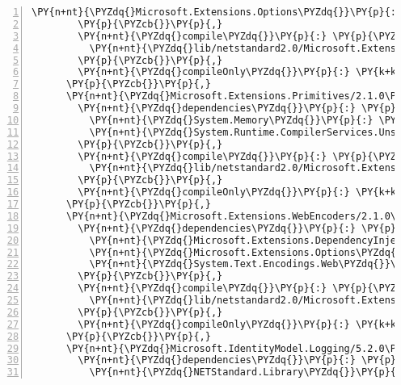 \begin{Verbatim}[commandchars=\\\{\},numbers=left,firstnumber=1,stepnumber=1,numberblanklines=0]
          \PY{n+nt}{\PYZdq{}Microsoft.Extensions.Options\PYZdq{}}\PY{p}{:} \PY{l+s+s2}{\PYZdq{}2.1.0\PYZhy{}rc1\PYZhy{}final\PYZdq{}}
        \PY{p}{\PYZcb{}}\PY{p}{,}
        \PY{n+nt}{\PYZdq{}compile\PYZdq{}}\PY{p}{:} \PY{p}{\PYZob{}}
          \PY{n+nt}{\PYZdq{}lib/netstandard2.0/Microsoft.Extensions.Options.ConfigurationExtensions.dll\PYZdq{}}\PY{p}{:} \PY{p}{\PYZob{}}\PY{p}{\PYZcb{}}
        \PY{p}{\PYZcb{}}\PY{p}{,}
        \PY{n+nt}{\PYZdq{}compileOnly\PYZdq{}}\PY{p}{:} \PY{k+kc}{true}
      \PY{p}{\PYZcb{}}\PY{p}{,}
      \PY{n+nt}{\PYZdq{}Microsoft.Extensions.Primitives/2.1.0\PYZhy{}rc1\PYZhy{}final\PYZdq{}}\PY{p}{:} \PY{p}{\PYZob{}}
        \PY{n+nt}{\PYZdq{}dependencies\PYZdq{}}\PY{p}{:} \PY{p}{\PYZob{}}
          \PY{n+nt}{\PYZdq{}System.Memory\PYZdq{}}\PY{p}{:} \PY{l+s+s2}{\PYZdq{}4.5.0\PYZhy{}rc1\PYZdq{}}\PY{p}{,}
          \PY{n+nt}{\PYZdq{}System.Runtime.CompilerServices.Unsafe\PYZdq{}}\PY{p}{:} \PY{l+s+s2}{\PYZdq{}4.5.0\PYZhy{}rc1\PYZdq{}}
        \PY{p}{\PYZcb{}}\PY{p}{,}
        \PY{n+nt}{\PYZdq{}compile\PYZdq{}}\PY{p}{:} \PY{p}{\PYZob{}}
          \PY{n+nt}{\PYZdq{}lib/netstandard2.0/Microsoft.Extensions.Primitives.dll\PYZdq{}}\PY{p}{:} \PY{p}{\PYZob{}}\PY{p}{\PYZcb{}}
        \PY{p}{\PYZcb{}}\PY{p}{,}
        \PY{n+nt}{\PYZdq{}compileOnly\PYZdq{}}\PY{p}{:} \PY{k+kc}{true}
      \PY{p}{\PYZcb{}}\PY{p}{,}
      \PY{n+nt}{\PYZdq{}Microsoft.Extensions.WebEncoders/2.1.0\PYZhy{}rc1\PYZhy{}final\PYZdq{}}\PY{p}{:} \PY{p}{\PYZob{}}
        \PY{n+nt}{\PYZdq{}dependencies\PYZdq{}}\PY{p}{:} \PY{p}{\PYZob{}}
          \PY{n+nt}{\PYZdq{}Microsoft.Extensions.DependencyInjection.Abstractions\PYZdq{}}\PY{p}{:} \PY{l+s+s2}{\PYZdq{}2.1.0\PYZhy{}rc1\PYZhy{}final\PYZdq{}}\PY{p}{,}
          \PY{n+nt}{\PYZdq{}Microsoft.Extensions.Options\PYZdq{}}\PY{p}{:} \PY{l+s+s2}{\PYZdq{}2.1.0\PYZhy{}rc1\PYZhy{}final\PYZdq{}}\PY{p}{,}
          \PY{n+nt}{\PYZdq{}System.Text.Encodings.Web\PYZdq{}}\PY{p}{:} \PY{l+s+s2}{\PYZdq{}4.5.0\PYZhy{}rc1\PYZdq{}}
        \PY{p}{\PYZcb{}}\PY{p}{,}
        \PY{n+nt}{\PYZdq{}compile\PYZdq{}}\PY{p}{:} \PY{p}{\PYZob{}}
          \PY{n+nt}{\PYZdq{}lib/netstandard2.0/Microsoft.Extensions.WebEncoders.dll\PYZdq{}}\PY{p}{:} \PY{p}{\PYZob{}}\PY{p}{\PYZcb{}}
        \PY{p}{\PYZcb{}}\PY{p}{,}
        \PY{n+nt}{\PYZdq{}compileOnly\PYZdq{}}\PY{p}{:} \PY{k+kc}{true}
      \PY{p}{\PYZcb{}}\PY{p}{,}
      \PY{n+nt}{\PYZdq{}Microsoft.IdentityModel.Logging/5.2.0\PYZdq{}}\PY{p}{:} \PY{p}{\PYZob{}}
        \PY{n+nt}{\PYZdq{}dependencies\PYZdq{}}\PY{p}{:} \PY{p}{\PYZob{}}
          \PY{n+nt}{\PYZdq{}NETStandard.Library\PYZdq{}}\PY{p}{:} \PY{l+s+s2}{\PYZdq{}2.0.3\PYZdq{}}\PY{p}{,}

\end{Verbatim}
